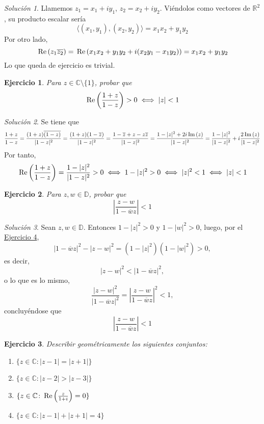 \documentclass[11pt]{report}
\newcommand{\R}{\mathbb R}
\newcommand{\C}{\mathbb C}
\newcommand{\D}{\mathbb D}
\newcommand{\pars}[1]{\left( #1 \right)} %
\renewcommand{\Re}[1]{\,\textup{Re}\pars{#1}}
\renewcommand{\Im}[1]{\,\textup{Im}\pars{#1}}
\newtheorem{exercise}{Ejercicio}
\theoremstyle{remark}
\newtheorem*{resolution}{Solución}
\begin{document}
\begin{resolution}
    Llamemos $z_1=x_1+iy_1$, $z_2 = x_2+iy_2$. Viéndolos como vectores de $\R^2$, su producto escalar sería
    \[\langle (x_1,y_1),(x_2,y_2) \rangle = x_1x_2+y_1y_2\]
    Por otro lado,
    \[\Re{z_1\overline{z_2}} = \Re{x_1x_2+y_1y_2+i(x_2y_1-x_1y_2)} = x_1x_2+y_1y_2\]
    Lo que queda de ejercicio es trivial.
\end{resolution}

\begin{exercise}
    Para $z \in \C \setminus \{1\}$, probar que
    \[\Re{\frac{1+z}{1-z}} > 0 \iff |z| < 1\]
\end{exercise}

\begin{resolution}
    Se tiene que
    \[\frac{1+z}{1-z}= \frac{(1+z)\overline{(1-z)}}{|1-z|^2} = \frac{(1+z)(1-\overline{z})}{|1-z|^2} = \frac{1-\overline{z}+z-z\overline{z}}{|1-z|^2} = \frac{1-|z|^2+2i\Im{z}}{|1-z|^2} = \frac{1-|z|^2}{|1-z|^2}+i\frac{2\Im{z}}{|1-z|^2}\]
    Por tanto,
    \[\Re{\frac{1+z}{1-z}} = \frac{1-|z|^2}{|1-z|^2} > 0 \iff 1-|z|^2>0 \iff |z|^2 < 1 \iff |z| < 1\]
\end{resolution}

\begin{exercise}
    Para $z, w \in \D$, probar que
    \[\left|\frac{z-w}{1-\overline{w}z}\right|<1\]
\end{exercise}

\begin{resolution}
    Sean $z,w \in \D$. Entonces $1-|z|^2>0$ y $1-|w|^2>0$, luego, por el \hyperref[ex4]{\color{blue}Ejercicio 4}, 
    \[|1-\overline{w}z|^2-|z-w|^2 = \pars{1-|z|^2}\pars{1-|w|^2} > 0,\]
    es decir,
    \[|z-w|^2<|1-\overline{w}z|^2,\]
    o lo que es lo mismo,
    \[\frac{|z-w|^2}{|1-\overline{w}z|^2} = \left|\frac{z-w}{1-\overline{w}z}\right|^2 < 1,\]
    concluyéndose que
    \[\left|\frac{z-w}{1-\overline{w}z}\right| < 1\]
\end{resolution}

\pagebreak

\begin{exercise}
    Describir geométricamente los siguientes conjuntos:
    \begin{enumerate}
        \item $\{z \in \C \colon |z-1| = |z+1|\}$
        \item $\{z \in \C \colon |z-2| > |z-3|\}$
        \item $\{z \in \C \colon \Re{\frac{z}{1+i}}=0\}$
        \item $\{z \in \C \colon |z-1|+|z+1|=4\}$
    \end{enumerate}
\end{exercise}
\end{document}
